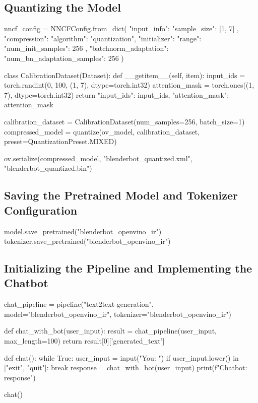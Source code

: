 \documentclass{josis}
\begin{document}
\subsection{Quantizing the Model}
\begin{python}
nncf_config = NNCFConfig.from_dict({
    "input_info": {
        "sample_size": [1, 7]
    },
    "compression": {
        "algorithm": "quantization",
        "initializer": {
            "range": {
                "num_init_samples": 256
            },
            "batchnorm_adaptation": {
                "num_bn_adaptation_samples": 256
            }
        }
    }
})

class CalibrationDataset(Dataset):
    def __getitem__(self, item):
        input_ids = torch.randint(0, 100, (1, 7), dtype=torch.int32)
        attention_mask = torch.ones((1, 7), dtype=torch.int32)
        return {"input_ids": input_ids, "attention_mask": attention_mask}

calibration_dataset = CalibrationDataset(num_samples=256, batch_size=1)
compressed_model = quantize(ov_model, calibration_dataset, preset=QuantizationPreset.MIXED)

ov.serialize(compressed_model, "blenderbot_quantized.xml", "blenderbot_quantized.bin")
\end{python}

\subsection{Saving the Pretrained Model and Tokenizer Configuration}
\begin{python}
model.save_pretrained("blenderbot_openvino_ir")
tokenizer.save_pretrained("blenderbot_openvino_ir")
\end{python}

\subsection{Initializing the Pipeline and Implementing the Chatbot}
\begin{python}
chat_pipeline = pipeline("text2text-generation", model="blenderbot_openvino_ir", tokenizer="blenderbot_openvino_ir")

def chat_with_bot(user_input):
    result = chat_pipeline(user_input, max_length=100)
    return result[0]['generated_text']

def chat():
    while True:
        user_input = input("You: ")
        if user_input.lower() in ["exit", "quit"]:
            break
        response = chat_with_bot(user_input)
        print(f"Chatbot: {response}")

chat()
\end{python}
\end{document}
